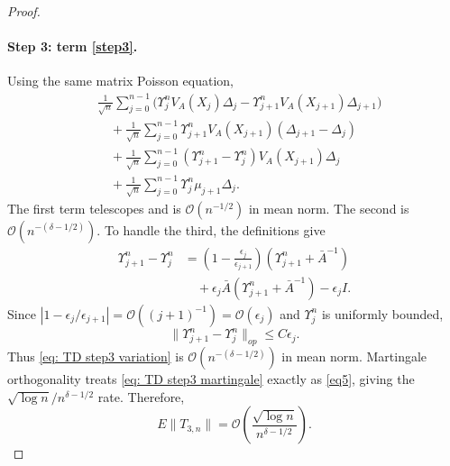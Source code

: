 \documentclass[11pt]{article}
\begin{document}
\begin{proof}
\paragraph{Step 3: term \eqref{step3}.}
Using the same matrix Poisson equation,
\begin{align}
&\frac1{\sqrt n}\sum_{j=0}^{n-1}
\bigl(\Upsilon_j^nV_A(X_j)\Delta_j
-\Upsilon_{j+1}^nV_A(X_{j+1})\Delta_{j+1}\bigr)
\label{eq: TD step3 boundary}\\
&\quad+
\frac1{\sqrt n}\sum_{j=0}^{n-1}
\Upsilon_{j+1}^nV_A(X_{j+1})(\Delta_{j+1}-\Delta_j)
\label{eq: TD step3 increment}\\
&\quad+
\frac1{\sqrt n}\sum_{j=0}^{n-1}
(\Upsilon_{j+1}^n-\Upsilon_j^n)V_A(X_{j+1})\Delta_j
\label{eq: TD step3 variation}\\
&\quad+
\frac1{\sqrt n}\sum_{j=0}^{n-1}
\Upsilon_j^n\mu_{j+1}\Delta_j.
\label{eq: TD step3 martingale}
\end{align}
The first term telescopes and is $\mathcal O(n^{-1/2})$ in mean norm. The
second is $\mathcal O(n^{-(\delta-1/2)})$. To handle the third, the definitions
give
\begin{align*}
\Upsilon_{j+1}^n-\Upsilon_j^n
&=
\left(1-\frac{\epsilon_j}{\epsilon_{j+1}}\right)
(\Upsilon_{j+1}^n+\bar A^{-1})\\
&\quad+
\epsilon_j\bar A(\Upsilon_{j+1}^n+\bar A^{-1})
-\epsilon_j I.
\end{align*}
Since
$|1-\epsilon_j/\epsilon_{j+1}|=\mathcal O((j+1)^{-1})
=\mathcal O(\epsilon_j)$ and $\Upsilon_j^n$ is uniformly bounded,
\begin{equation}\label{eq: Upsilon variation TD}
    \|\Upsilon_{j+1}^n-\Upsilon_j^n\|_{op}
    \leq C\epsilon_j.
\end{equation}
Thus \eqref{eq: TD step3 variation} is
$\mathcal O(n^{-(\delta-1/2)})$ in mean norm. Martingale orthogonality treats
\eqref{eq: TD step3 martingale} exactly as \eqref{eq5}, giving the
$\sqrt{\log n}/n^{\delta-1/2}$ rate. Therefore,
\begin{equation}\label{eq: TD step3 bound}
    E\|T_{3,n}\|
    =
    \mathcal O\!\left(
        \frac{\sqrt{\log n}}{n^{\delta-1/2}}
    \right).
\end{equation}


\end{proof}
\end{document}
